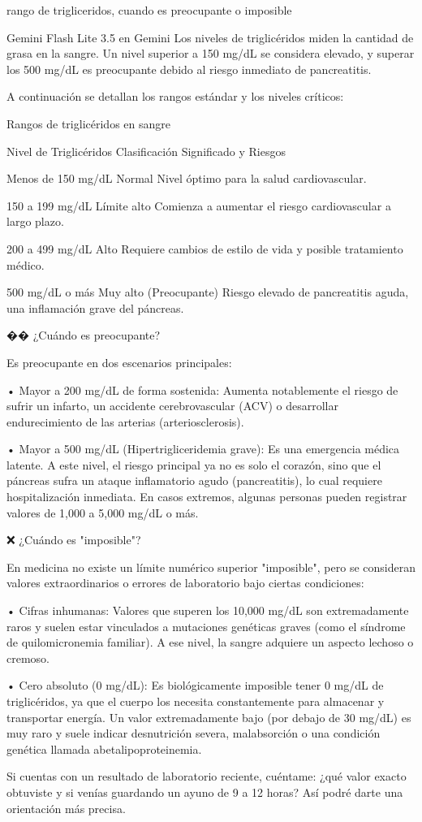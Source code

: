 \documentclass[12pt,a4paper,oneside]{book}
\begin{document}
\begin{iaprompt}
rango de trigliceridos, cuando es preocupante o imposible
\end{iaprompt}
\begin{iaresp} {Gemini Flash Lite 3.5 en Gemini}
Los niveles de triglicéridos miden la cantidad de grasa en la sangre. Un nivel superior a 150 mg/dL se considera elevado, y superar los 500 mg/dL es preocupante debido al riesgo inmediato de pancreatitis.

A continuación se detallan los rangos estándar y los niveles críticos:

Rangos de triglicéridos en sangre


Nivel de Triglicéridos	Clasificación	Significado y Riesgos

Menos de 150 mg/dL	Normal	Nivel óptimo para la salud cardiovascular.

150 a 199 mg/dL	Límite alto	Comienza a aumentar el riesgo cardiovascular a largo plazo.

200 a 499 mg/dL	Alto	Requiere cambios de estilo de vida y posible tratamiento médico.

500 mg/dL o más	Muy alto (Preocupante)	Riesgo elevado de pancreatitis aguda, una inflamación grave del páncreas.


�� ¿Cuándo es preocupante?

Es preocupante en dos escenarios principales:

• Mayor a 200 mg/dL de forma sostenida: Aumenta notablemente el riesgo de sufrir un infarto, un accidente cerebrovascular (ACV) o desarrollar endurecimiento de las arterias (arteriosclerosis).

• Mayor a 500 mg/dL (Hipertrigliceridemia grave): Es una emergencia médica latente. A este nivel, el riesgo principal ya no es solo el corazón, sino que el páncreas sufra un ataque inflamatorio agudo (pancreatitis), lo cual requiere hospitalización inmediata. En casos extremos, algunas personas pueden registrar valores de 1,000 a 5,000 mg/dL o más.

❌ ¿Cuándo es "imposible"?

En medicina no existe un límite numérico superior "imposible", pero se consideran valores extraordinarios o errores de laboratorio bajo ciertas condiciones:

• Cifras inhumanas: Valores que superen los 10,000 mg/dL son extremadamente raros y suelen estar vinculados a mutaciones genéticas graves (como el síndrome de quilomicronemia familiar). A ese nivel, la sangre adquiere un aspecto lechoso o cremoso.

• Cero absoluto (0 mg/dL): Es biológicamente imposible tener 0 mg/dL de triglicéridos, ya que el cuerpo los necesita constantemente para almacenar y transportar energía. Un valor extremadamente bajo (por debajo de 30 mg/dL) es muy raro y suele indicar desnutrición severa, malabsorción o una condición genética llamada abetalipoproteinemia.

Si cuentas con un resultado de laboratorio reciente, cuéntame: ¿qué valor exacto obtuviste y si venías guardando un ayuno de 9 a 12 horas? Así podré darte una orientación más precisa.
\end{iaresp}
\end{document}
